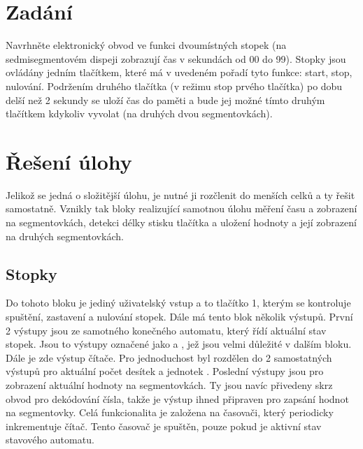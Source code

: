 \documentclass[FM,ZP]{tulthesis}
\begin{document}
	\renewcommand{\baselinestretch}{1.50}
	\setlength\parindent{1.2cm}
	\selectfont
	
	\begingroup
	\renewcommand{\cleardoublepage}{}
	\renewcommand{\clearpage}{}
	\chapter{Zadání}
	\endgroup
	Navrhněte elektronický obvod ve funkci dvoumístných stopek (na sedmisegmentovém dispeji zobrazují čas v sekundách od 00 do 99). Stopky jsou ovládány jedním tlačítkem, které má v uvedeném pořadí tyto funkce: start, stop, nulování. Podržením druhého tlačítka (v režimu stop prvého tlačítka) po dobu delší než 2 sekundy se uloží čas do paměti a bude jej možné tímto druhým tlačítkem kdykoliv vyvolat (na druhých dvou segmentovkách).
	
	\begingroup
	\renewcommand{\cleardoublepage}{}
	\renewcommand{\clearpage}{}
	\newpage
	\chapter{Řešení úlohy}
	\endgroup
	Jelikož se jedná o složitější úlohu, je nutné ji rozčlenit do menších celků a ty řešit samostatně. Vznikly tak bloky realizující samotnou úlohu měření času a zobrazení na segmentovkách, detekci délky stisku tlačítka a uložení hodnoty a její zobrazení na druhých segmentovkách.
	
	\section{Stopky}
	Do tohoto bloku je jediný uživatelský vstup a to tlačítko 1, kterým se kontroluje spuštění, zastavení a nulování stopek. Dále má tento blok několik výstupů. První 2 výstupy jsou ze samotného konečného automatu, který řídí aktuální stav stopek. Jsou to výstupy označené jako  a , jež jsou velmi důležité v dalším bloku. Dále je zde výstup čítače. Pro jednoduchost byl rozdělen do 2 samostatných výstupů pro aktuální počet desítek  a jednotek . Poslední výstupy jsou pro zobrazení aktuální hodnoty na segmentovkách. Ty jsou navíc přivedeny skrz obvod pro dekódování čísla, takže je výstup ihned připraven pro zapsání hodnot na segmentovky.
	Celá funkcionalita je založena na časovači, který periodicky inkrementuje čítač. Tento časovač je spuštěn, pouze pokud je aktivní stav  stavového automatu.
	
\end{document}
